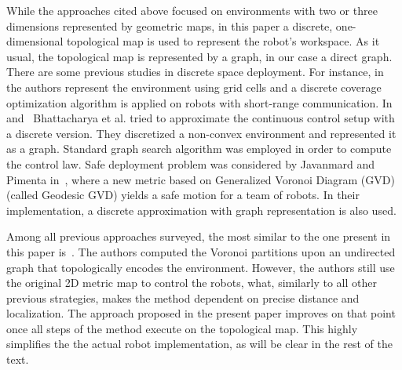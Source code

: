 \documentclass[twocolumn]{svjour3}       %
\begin{document}
While the approaches cited above focused on environments with two or three dimensions represented by geometric maps, in this paper a discrete, one-dimensional topological map is used to represent the robot's workspace. As it usual, the topological map is represented by a graph, in our case a direct graph.
% 
There are some previous studies in discrete space deployment. For instance, in~\cite{Durham2012} the authors represent the environment using grid cells and a discrete coverage optimization algorithm is applied on robots with short-range communication.
% 
In~\cite{Bhattacharya2013a} and~\cite{Bhattacharya2013IJRR} Bhattacharya et al. tried to approximate the continuous control setup with a discrete version. They discretized a non-convex environment and represented it as a graph. Standard graph search algorithm was employed in order to compute the control law.
%
Safe deployment problem was considered by Javanmard  and Pimenta in~\cite{reza2014}, where a new metric based on Generalized Voronoi Diagram (GVD) (called Geodesic GVD) yields a safe motion for a team of robots. In their implementation, a discrete approximation with graph representation is also used. 

Among all previous approaches surveyed, the most similar to the one present in this paper is~\cite{Yun2013}. The authors computed the Voronoi partitions upon an undirected graph that topologically encodes the environment. However, the authors still use the original 2D metric map to control the robots, what, similarly to all other previous strategies, makes the method dependent on precise distance and localization. The approach proposed in the present paper improves on that point once all steps of the method execute on the topological map. This highly simplifies the the actual robot implementation, as will be clear in the rest of the text.
\end{document}

